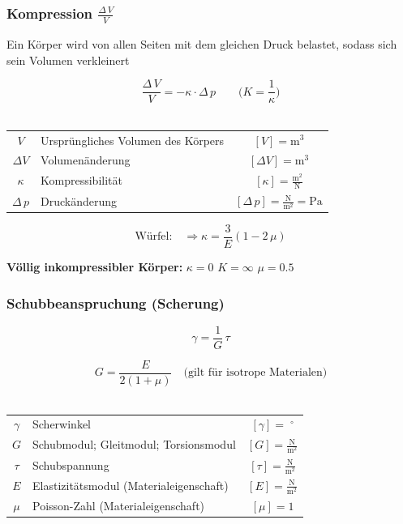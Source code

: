 		\subsubsection{Kompression $\frac{\Delta \, V}{V}$}
			Ein Körper wird von allen Seiten mit dem gleichen Druck belastet, sodass sich sein Volumen verkleinert 
			
			$$ \boxed{ \frac{\Delta \, V}{V} = - \kappa \cdot \Delta \, p } \qquad \Big( K = \frac{1}{\kappa} \Big) $$ \\ 
			
			\begin{tabular}{c l c}
				$V$ & Ursprüngliches Volumen des Körpers & $[V] = \mathrm{m^3}$ \\
				$\Delta V$ & Volumenänderung & $[\Delta V] = \mathrm{m^3}$ \\
				$\kappa$ & Kompressibilität & $[\kappa] = \mathrm{\frac{m^2}{N}}$ \\
				$\Delta \, p$ & Druckänderung & $[\Delta \, p] = \mathrm{\frac{N}{m^2} = Pa}$  \\ 
			\end{tabular}
			
			$$ \boxed{ \text{Würfel:} \quad \Rightarrow \kappa = \frac{3}{E} (1 - 2 \, \mu) }$$ 
			
			\textbf{Völlig inkompressibler Körper:} $\kappa = 0$  \qquad $K = \infty$ \qquad $\mu = 0.5$

		\subsubsection{Schubbeanspruchung (Scherung)}
		
			$$ \boxed{ \gamma = \frac{1}{G} \, \tau }$$ 
			
			$$ \boxed{ G = \frac{E}{2(1 + \mu)}  \quad \text{(gilt für isotrope Materialen)} } $$\\

			\begin{tabular}{c l c}
				$\gamma$ & Scherwinkel & $[\gamma] = \; ^\circ $ \\
				\rule{0pt}{10pt}$G$ & Schubmodul; Gleitmodul; Torsionsmodul & $[G] = \mathrm{\frac{N}{m^2}}$ \\
				\rule{0pt}{10pt}$\tau$ & Schubspannung & $[\tau] = \mathrm{\frac{N}{m^2}}$ \\
				\rule{0pt}{10pt}$E$ & Elastizitätsmodul (Materialeigenschaft) & $[E] = \mathrm{\frac{N}{m^2}}$ \\
				$\mu$ & Poisson-Zahl (Materialeigenschaft) & $[\mu] = 1$ \\
			\end{tabular}

